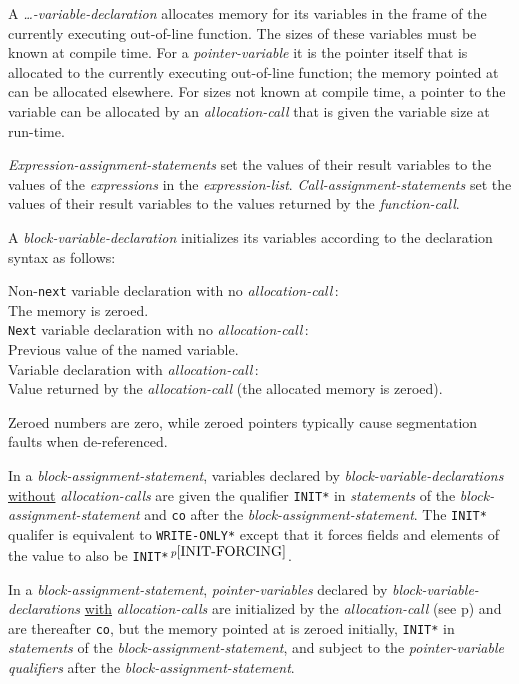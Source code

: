 \documentclass[12pt]{article}
\newcommand{\pagref}[1]{p\pageref{#1}}
\newcommand{\pagnote}[1]{$\,^{p\pageref{#1}}$}
\newcommand{\EOL}{\penalty \exhyphenpenalty}
\newenvironment{indpar}[1][0.3in]%
	{\begin{list}{}%
		     {\setlength{\itemsep}{0in}%
		      \setlength{\topsep}{0in}%
		      \setlength{\parsep}{1ex}%
		      \setlength{\labelwidth}{#1}%
		      \setlength{\leftmargin}{#1}%
		      \addtolength{\leftmargin}{\labelsep}}%
	 \item}%
	{\end{list}}
\begin{document}
A {\em \ldots-variable-declaration}\label{VARIABLE-ALLOCATION}
allocates memory for its variables
in the frame of the currently executing out-of-line function.
The sizes of these variables must be known at compile time.
For a {\em pointer-variable} it is the pointer itself that is
allocated to the currently executing out-of-line function; the
memory pointed at can be allocated elsewhere.
For sizes not known at compile time, a pointer to the variable
can be allocated by an {\em allocation-call} that is given the variable
size at run-time.

{\em Expression-assignment-statements} set the values of their result variables
to the values of the {\em expressions} in the {\em expression-list}.
{\em Call-assignment-statements} set the values of their result variables
to the values returned by the {\em function-call}.

A {\em block-variable-declaration}
initializes its variables
according to the declaration syntax as follows:
\begin{indpar}[0.05in]
Non-{\tt next} variable declaration with no {\em allocation-call}\,: \\
\hspace*{3em}The memory is zeroed. \\
{\tt Next} variable declaration with no {\em allocation-call}\,: \\
\hspace*{3em}Previous value of the named variable. \\
Variable declaration with {\em allocation-call}\,: \\
\hspace*{3em}Value returned by the {\em allocation-call}
             (the allocated memory is zeroed).
\end{indpar}
Zeroed numbers are zero, while zeroed pointers typically
cause segmentation faults when de-referenced.

In a {\em block-assignment-statement},
variables declared by {\em block-variable-declarations}
\underline{without} {\em allocation-calls}
are given the qualifier {\tt *INIT*} in {\em statements}
of the {\em block-assignment-statement} and {\tt co} after the
{\em block-assignment-statement}.
The {\tt *INIT*} qualifer is equivalent to {\tt *WRITE-\EOL ONLY*}
except that it forces fields and elements of the value to also
be {\tt *INIT*}\pagnote{INIT-FORCING}.

In a {\em block-assignment-statement},
{\em pointer-variables} declared by {\em block-variable-declarations}
\underline{with} {\em allocation-calls}
are initialized by the {\em allocation-call}
(see \pagref{ALLOCATION-CALLS}) and are thereafter
{\tt co}, but the memory
pointed at is zeroed initially, 
{\tt *INIT*} in {\em statements}
of the {\em block-assignment-statement}, and 
subject to the {\em pointer-variable} {\em qualifiers} after
the {\em block-assignment-statement}.
\end{document}
